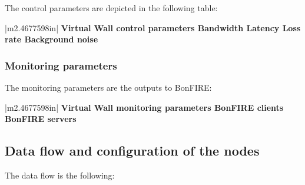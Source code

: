 \documentclass[a4paper]{article}
\makeatletter
\newcommand\arraybslash{\let\\\@arraycr}
\makeatother
\begin{document}
The control parameters are depicted in the following table:


\bigskip

\begin{center}
\tablehead{}
\begin{supertabular}{|m{2.4677598in}|}
\hline
\centering\arraybslash \bfseries Virtual Wall control parameters\\\hline
\centering\arraybslash Bandwidth\\\hline
\centering\arraybslash Latency\\\hline
\centering\arraybslash Loss rate\\\hline
\centering\arraybslash Background noise\\\hline
\end{supertabular}
\end{center}

\bigskip

\subsubsection[Monitoring parameters]{Monitoring parameters}
\hypertarget{Toc381777239}{}
\bigskip

The monitoring parameters are the outputs to BonFIRE:


\bigskip

\begin{center}
\tablehead{}
\begin{supertabular}{|m{2.4677598in}|}
\hline
\centering\arraybslash \bfseries Virtual Wall monitoring
parameters\\\hline
\centering\arraybslash BonFIRE clients\\\hline
\centering\arraybslash BonFIRE servers\\\hline
\end{supertabular}
\end{center}

\bigskip

\subsection[Data flow and configuration of the nodes]{Data flow and
configuration of the nodes}
\hypertarget{Toc381777240}{}
\bigskip

The data flow is the following:
\end{document}
